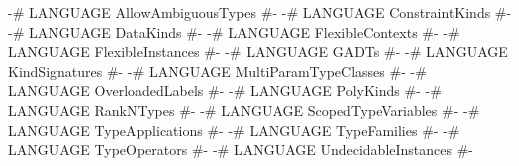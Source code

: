 \begin{code}
{-# LANGUAGE AllowAmbiguousTypes   #-}
{-# LANGUAGE ConstraintKinds       #-}
{-# LANGUAGE DataKinds             #-}
{-# LANGUAGE FlexibleContexts      #-}
{-# LANGUAGE FlexibleInstances     #-}
{-# LANGUAGE GADTs                 #-}
{-# LANGUAGE KindSignatures        #-}
{-# LANGUAGE MultiParamTypeClasses #-}
{-# LANGUAGE OverloadedLabels      #-}
{-# LANGUAGE PolyKinds             #-}
{-# LANGUAGE RankNTypes            #-}
{-# LANGUAGE ScopedTypeVariables   #-}
{-# LANGUAGE TypeApplications      #-}
{-# LANGUAGE TypeFamilies          #-}
{-# LANGUAGE TypeOperators         #-}
{-# LANGUAGE UndecidableInstances  #-}
\end{code}
